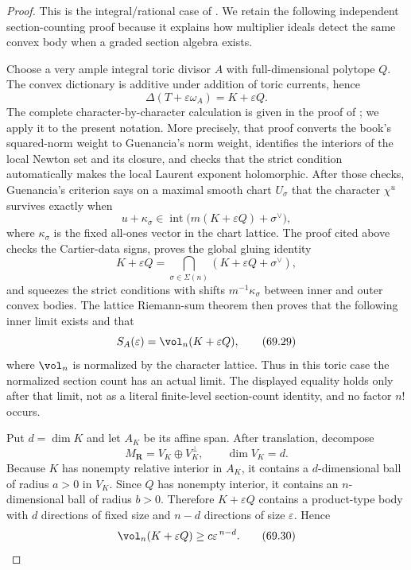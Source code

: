 \begin{proof}
This is the integral/rational case of
.  We retain the following independent
section-counting proof because it explains how multiplier ideals detect the
same convex body when a graded section algebra exists.

Choose a very ample integral toric divisor \(A\) with full-dimensional
polytope \(Q\). The convex dictionary is additive under addition of
toric currents, hence
\[
               \Delta(T+\varepsilon\omega_A)
                         =K+\varepsilon Q.
\tag{69.28}\label{eq:verified-minkowski-perturbation}
\]
The complete character-by-character calculation is given in the proof of
; we apply it to the present notation.  More
precisely, that proof converts the book's squared-norm weight to
Guenancia's norm weight, identifies the interiors of the local Newton set
and its closure, and checks that the strict condition automatically makes
the local Laurent exponent holomorphic.  After those checks, Guenancia's
criterion \cite[Theorem~1.13]{Guenancia12} says on a maximal smooth chart
\(U_\sigma\) that the character \(\chi^u\) survives exactly when
\[
 u+\kappa_\sigma\in
 \operatorname{int}\bigl(m(K+\varepsilon Q)+\sigma^\vee\bigr),
\]
where \(\kappa_\sigma\) is the fixed all-ones vector in the chart lattice.
The proof cited above checks the Cartier-data signs, proves the global gluing
identity
\[
 K+\varepsilon Q
 =\bigcap_{\sigma\in\Sigma(n)}
   (K+\varepsilon Q+\sigma^\vee),
\]
and squeezes the strict conditions with shifts \(m^{-1}\kappa_\sigma\) between
inner and outer convex bodies.  The lattice Riemann-sum theorem then proves
that the following inner limit exists and that
\[
                         S_A(\varepsilon)
                         =\vol_n(K+\varepsilon Q),
\tag{69.29}\label{eq:verified-toric-rr}
\]
where \(\vol_n\) is normalized by the character lattice.  Thus in this toric
case the normalized section count has an actual limit.  The displayed equality
holds only after that limit, not as a literal finite-level section-count
identity, and no factor \(n!\) occurs.

Put \(d=\dim K\) and let \(A_K\) be its affine span. After translation,
decompose
\[
                  M_{\mathbf R}=V_K\oplus V_K^\perp,
       \qquad \dim V_K=d.
\]
Because \(K\) has nonempty relative interior in \(A_K\), it contains a
\(d\)-dimensional ball of radius \(a>0\) in \(V_K\). Since \(Q\) has
nonempty interior, it contains an \(n\)-dimensional ball of radius
\(b>0\). Therefore \(K+\varepsilon Q\) contains a product-type body
with \(d\) directions of fixed size and \(n-d\) directions of size
\(\varepsilon\). Hence
\[
                \vol_n(K+\varepsilon Q)
                       \geq c\varepsilon^{\,n-d}.
\tag{69.30}\label{eq:verified-volume-lower}
\]


\end{proof}
